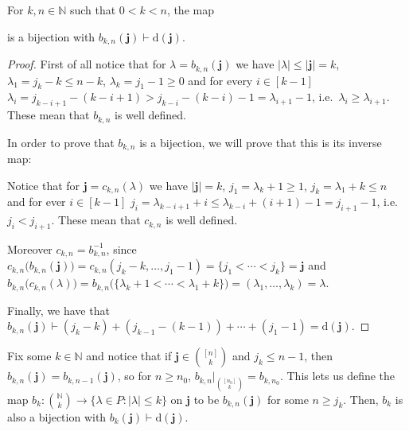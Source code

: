 \begin{proposition}\label{prop:poset_bijection} For $k,n\in\mathbb{N}$ such that $0<k<n$, the map
\begin{center}
\end{center}
is a bijection with $b_{k,n}(\mathbf{j})\vdash\mathrm{d}(\mathbf{j})$.
\end{proposition}
\begin{proof} First of all notice that for $\lambda=b_{k,n}(\mathbf{j})$ we have $|\lambda|\leq|\mathbf{j}|=k$, $\lambda_1=j_k-k\leq n-k$, $\lambda_k=j_1-1\geq 0$ and for every $i\in[k-1]$ $\lambda_i=j_{k-i+1}-(k-i+1)>j_{k-i}-(k-i)-1=\lambda_{i+1}-1$, i.e.\ $\lambda_i\geq\lambda_{i+1}$. These mean that $b_{k,n}$ is well defined.

In order to prove that $b_{k,n}$ is a bijection, we will prove that this is its inverse map:
\begin{center}
\end{center}
Notice that for $\mathbf{j}=c_{k,n}(\lambda)$ we have $|\mathbf{j}|=k$, $j_1=\lambda_k+1\geq1$, $j_k=\lambda_1+k\leq n$ and for ever $i\in[k-1]$ $j_i=\lambda_{k-i+1}+i\leq\lambda_{k-i}+(i+1)-1=j_{i+1}-1$, i.e.\ $j_i<j_{i+1}$. These mean that $c_{k,n}$ is well defined.

Moreover $c_{k,n}=b_{k,n}^{-1}$, since $c_{k,n}\big(b_{k,n}(\mathbf{j})\big)=c_{k,n}(j_k-k,\ldots,j_1-1)=\{j_1<\cdots<j_k\}=\mathbf{j}$ and $b_{k,n}\big(c_{k,n}(\lambda)\big)=b_{k,n}\big(\{\lambda_k+1<\cdots<\lambda_1+k\}\big)=(\lambda_1,\ldots,\lambda_k)=\lambda$.

Finally, we have that $b_{k,n}(\mathbf{j})\vdash (j_k-k)+(j_{k-1}-(k-1))+\cdots+(j_1-1)=\mathrm{d}(\mathbf{j})$.
\end{proof}
\begin{remark}\label{rem:inf_poset_bijection} Fix some $k\in\mathbb{N}$ and notice that if $\mathbf{j}\in\binom{[n]}{k}$ and $j_k\leq n-1$, then $b_{k,n}(\mathbf{j})=b_{k,n-1}(\mathbf{j})$, so for $n\geq n_0$, $b_{k,n}|_{\binom{[n_0]}{k}}=b_{k,n_0}$. This lets us define the map $b_k:\binom{\mathbb{N}}{k}\to\big\{\lambda\in P:|\lambda|\leq k\}$ on $\mathbf{j}$ to be $b_{k,n}(\mathbf{j})$ for some $n\geq j_k$. Then, $b_k$ is also a bijection with $b_k(\mathbf{j})\vdash\mathrm{d}(\mathbf{j})$.
\end{remark}

